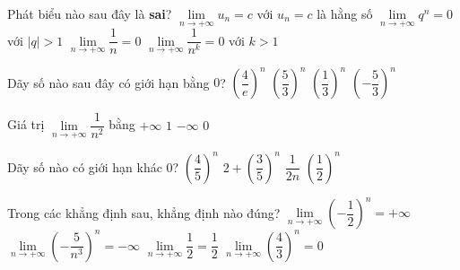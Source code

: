 \begin{ex}%
	Phát biểu nào sau đây là \textbf{sai}?
	\choice
	{$\lim\limits_{n\to +\infty} u_n=c$ với $u_n=c$ là hằng số}
	{\True $\lim\limits_{n\to +\infty} q^n=0$ với  $\vert q\vert > 1$}
	{$\lim\limits_{n\to +\infty}\dfrac{1}{n}=0$}
	{$\lim\limits_{n\to +\infty}\dfrac{1}{n^k}=0$ với $k > 1$}
\end{ex}

\begin{ex}%
	Dãy số nào sau đây có giới hạn bằng $0$?
	\choice
	{$\left(\dfrac{4}{e}\right)^n$}
	{$\left(\dfrac{5}{3}\right)^n$}
	{\True $\left(\dfrac{1}{3}\right)^n$}
	{$\left(-\dfrac{5}{3}\right)^n$}
\end{ex}

\begin{ex}%
	Giá trị $\lim\limits_{n\to +\infty}\dfrac{1}{n^2}$ bằng
	\choice
	{$+\infty$}
	{$1$}
	{$-\infty$}
	{\True $0$}
\end{ex}

\begin{ex}%
	Dãy số nào có giới hạn khác $0$?
	\choice
	{$\left(\dfrac{4}{5}\right)^n$}
	{\True $2+\left(\dfrac{3}{5}\right)^n$}
	{$\dfrac{1}{2n}$}
	{$\left(\dfrac{1}{2}\right)^n$}
\end{ex}

\begin{ex}%
	Trong các khẳng định sau, khẳng định nào đúng?
	\choice
	{$\lim\limits_{n\to +\infty}\left(-\dfrac{1}{2}\right)^n=+\infty$}
	{$\lim\limits_{n\to +\infty} \left(-\dfrac{5}{n^3}\right)^n=-\infty$}
	{\True $\lim\limits_{n\to +\infty} \dfrac{1}{2} = \dfrac{1}{2}$}
	{$\lim\limits_{n\to +\infty}\left(\dfrac{4}{3}\right)^n=0$}
\end{ex}


